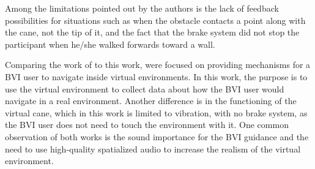 Among the limitations pointed out by the authors is the lack of feedback possibilities for situations such as when the obstacle contacts a point along with the cane, not the tip of it, and the fact that the brake system did not stop the participant when he/she walked forwards toward a wall.

Comparing the work of  to this work,  were focused on providing mechanisms for a BVI user to navigate inside virtual environments. In this work, the purpose is to use the virtual environment to collect data about how the BVI user would navigate in a real environment. Another difference is in the functioning of the virtual cane, which in this work is limited to vibration, with no brake system, as the BVI user does not need to touch the environment with it. One common observation of both works is the sound importance for the BVI guidance and the need to use high-quality spatialized audio to increase the realism of the virtual environment.